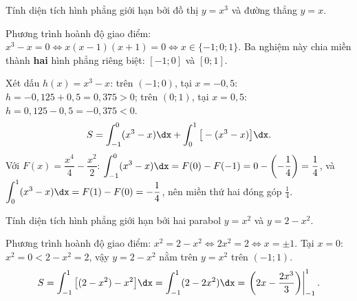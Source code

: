 \begin{hopvidu}
Tính diện tích hình phẳng giới hạn bởi đồ thị $y=x^3$ và đường thẳng $y=x$.
\end{hopvidu}
\begin{loigiai}
Phương trình hoành độ giao điểm: $x^3-x=0 \Leftrightarrow x(x-1)(x+1)=0 \Leftrightarrow x\in\{-1;0;1\}$. Ba nghiệm này chia miền thành \textbf{hai} hình phẳng riêng biệt: $[-1;0]$ và $[0;1]$.

Xét dấu $h(x)=x^3-x$: trên $(-1;0)$, tại $x=-0{,}5$: $h=-0{,}125+0{,}5=0{,}375>0$; trên $(0;1)$, tại $x=0{,}5$: $h=0{,}125-0{,}5=-0{,}375<0$.
\[
S=\int_{-1}^{0}(x^3-x)\dx + \int_0^1 \big[-(x^3-x)\big]\dx.
\]
Với $F(x)=\dfrac{x^4}{4}-\dfrac{x^2}{2}$: $\displaystyle\int_{-1}^0(x^3-x)\dx = F(0)-F(-1)=0-\left(-\frac14\right)=\frac14$, và $\displaystyle\int_0^1(x^3-x)\dx=F(1)-F(0)=-\frac14$, nên miền thứ hai đóng góp $\frac14$.
\end{loigiai}

\begin{center}
\end{center}

\begin{hopvidu}
Tính diện tích hình phẳng giới hạn bởi hai parabol $y=x^2$ và $y=2-x^2$.
\end{hopvidu}
\begin{loigiai}
Phương trình hoành độ giao điểm: $x^2=2-x^2 \Leftrightarrow 2x^2=2 \Leftrightarrow x=\pm1$. Tại $x=0$: $x^2=0 < 2-x^2=2$, vậy $y=2-x^2$ nằm trên $y=x^2$ trên $(-1;1)$.
\[
S=\int_{-1}^1 \big[(2-x^2)-x^2\big]\dx = \int_{-1}^1(2-2x^2)\dx = \left.\left(2x-\frac{2x^3}{3}\right)\right|_{-1}^{1}.
\]
\end{loigiai}

